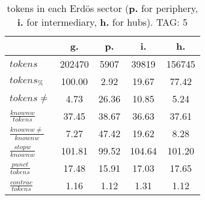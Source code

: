 \begin{table}[h!]
\begin{center}
\begin{tabular}{| l || c | c | c | c |}\hline
 & {\bf g.} & {\bf p.} & {\bf i.} & {\bf h.} \\\hline\hline
$tokens$ & 202470  & 5907  & 39819  & 156745 \\
$tokens_{\%}$ & 100.00  & 2.92  & 19.67  & 77.42 \\
$tokens \neq$ & 4.73  & 26.36  & 10.85  & 5.24 \\\hline
$\frac{knownw}{tokens}$ & 37.45  & 38.67  & 36.63  & 37.61 \\
$\frac{knownw \neq}{knownw}$ & 7.27  & 47.42  & 19.62  & 8.28 \\\hline
$\frac{stopw}{knownw}$ & 101.81  & 99.52  & 104.64  & 101.20 \\
$\frac{punct}{tokens}$ & 17.48  & 15.91  & 17.03  & 17.65 \\
$\frac{contrac}{tokens}$ & 1.16  & 1.12  & 1.31  & 1.12 \\\hline
\end{tabular}
\caption{tokens in each Erd\"os sector ({{\bf p.}} for periphery, {{\bf i.}} for intermediary, 
    {{\bf h.}} for hubs). TAG: 5}
\end{center}
\end{table}